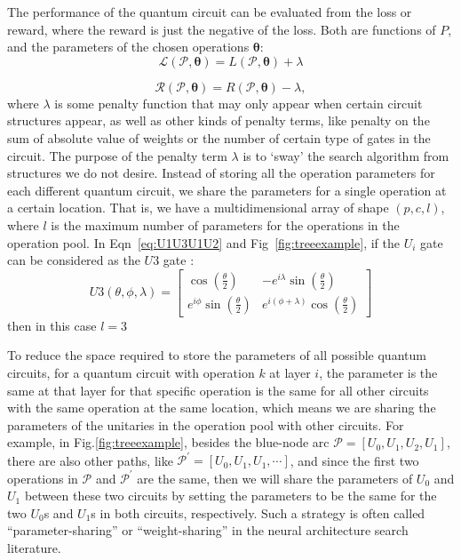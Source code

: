 \documentclass[a4paper,onecolumn,11pt]{quantumarticle}
\begin{document}
The performance of the quantum circuit can be evaluated from the loss or reward, where the reward is just the negative of the loss. Both are functions of $P$, and the parameters of the chosen operations $\boldsymbol{\theta}$:
\begin{equation}
    \mathcal{L}(\mathcal{P},\boldsymbol{\theta})=L(\mathcal{P}, \boldsymbol{\theta})+\lambda
\end{equation}

\begin{equation}
    \mathcal{R}(\mathcal{P},\boldsymbol{\theta})=R(\mathcal{P}, \boldsymbol{\theta})-\lambda,
\end{equation}
where $\lambda$ is some penalty function that may only appear when certain circuit structures appear, as well as other kinds of penalty terms, like penalty on the sum of absolute value of weights or the number of certain type of gates in the circuit. The purpose of the penalty term $\lambda$ is to `sway' the search algorithm from structures we do not desire.
Instead of storing all the operation parameters for each different quantum circuit, we share the parameters for a single operation at a certain location. That is, we have a multidimensional array of shape $(p, c, l)$, where $l$ is the maximum number of parameters for the operations in the operation pool. In Eqn~\ref{eq:U1U3U1U2} and Fig~\ref{fig:treeexample}, if the $U_i$ gate can be considered as the $U3$ gate \cite{nielsen00}:
\begin{equation}
U 3(\theta, \phi, \lambda)=\left[\begin{array}{cc}
\cos \left(\frac{\theta}{2}\right) & -e^{i \lambda} \sin \left(\frac{\theta}{2}\right) \\
e^{i \phi} \sin \left(\frac{\theta}{2}\right) & e^{i(\phi+\lambda)} \cos \left(\frac{\theta}{2}\right)
\end{array}\right]
\end{equation}
then in this case $l=3$

To reduce the space required to store the parameters of all possible quantum circuits, for a quantum circuit with operation $k$ at layer $i$, the parameter is the same at that layer for that specific operation is the same for all other circuits with the same operation at the same location, which means we are sharing the parameters of the unitaries in the operation pool with other circuits. For example, in Fig.\ref{fig:treeexample}, besides the blue-node arc $\mathcal{P}=[U_0, U_1, U_2, U_1]$, there are also other paths, like $\mathcal{P}^{'} = [U_0, U_1, U_1, \cdots]$, and since the first two operations in $\mathcal{P}$ and $\mathcal{P}^{'}$ are the same, then we will share the parameters of $U_0$ and $U_1$ between these two circuits by setting the parameters to be the same for the two $U_0$s and $U_1$s in both circuits, respectively.
Such a strategy is often called ``parameter-sharing'' or ``weight-sharing'' in the neural architecture search literature.
\end{document}
